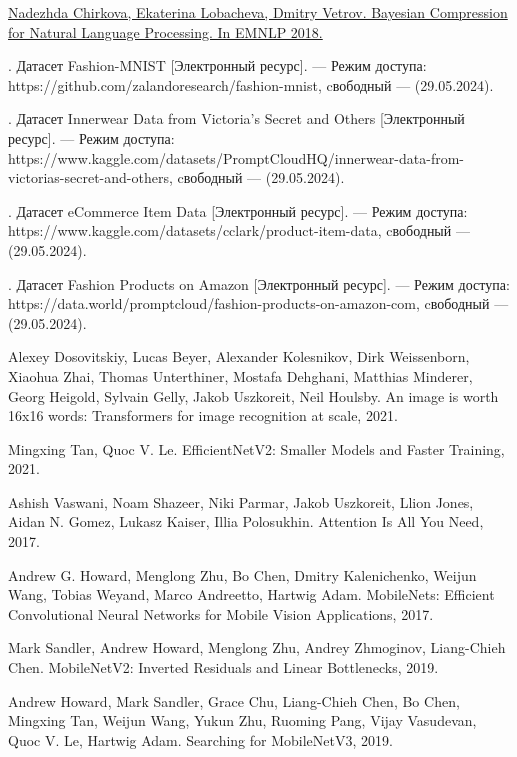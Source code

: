 \newpage 
\printbibliography[heading=bibintoc] 

\begin{thebibliography}{0}
	\hypertarget{chirkova18}{}
	\href{https://arxiv.org/abs/1810.10927}
	{Nadezhda Chirkova, Ekaterina Lobacheva, Dmitry Vetrov. Bayesian Compression for Natural Language Processing. In EMNLP 2018.}
	
	. Датасет Fashion-MNIST [Электронный ресурс]. — Режим доступа: https://github.com/zalandoresearch/fashion-mnist, cвободный — (29.05.2024).
	
	. Датасет Innerwear Data from Victoria's Secret and Others [Электронный ресурс]. — Режим доступа: https://www.kaggle.com/datasets/PromptCloudHQ/innerwear-data-from-victorias-secret-and-others, cвободный — (29.05.2024).
	
	. Датасет eCommerce Item Data [Электронный ресурс]. — Режим доступа: https://www.kaggle.com/datasets/cclark/product-item-data, cвободный — (29.05.2024).
	
	. Датасет Fashion Products on Amazon [Электронный ресурс]. — Режим доступа: https://data.world/promptcloud/fashion-products-on-amazon-com, cвободный — (29.05.2024).
	
	Alexey Dosovitskiy, Lucas Beyer, Alexander Kolesnikov, Dirk Weissenborn, Xiaohua Zhai, Thomas Unterthiner, Mostafa Dehghani, Matthias Minderer,
	Georg Heigold, Sylvain Gelly, Jakob Uszkoreit, Neil Houlsby. An image is worth 16x16 words: Transformers for image recognition at scale, 2021.
	
	Mingxing Tan, Quoc V. Le. EfficientNetV2: Smaller Models and Faster Training, 2021.
	
	Ashish Vaswani, Noam Shazeer, Niki Parmar, Jakob Uszkoreit, Llion Jones, Aidan N. Gomez, Lukasz Kaiser, Illia Polosukhin. Attention Is All You Need, 2017.
	
	Andrew G. Howard, Menglong Zhu, Bo Chen, Dmitry Kalenichenko, Weijun Wang, Tobias Weyand, Marco Andreetto, Hartwig Adam. MobileNets: Efficient Convolutional Neural Networks for Mobile Vision Applications, 2017.
	
	Mark Sandler, Andrew Howard, Menglong Zhu, Andrey Zhmoginov, Liang-Chieh Chen. MobileNetV2: Inverted Residuals and Linear Bottlenecks, 2019.
	
	Andrew Howard, Mark Sandler, Grace Chu, Liang-Chieh Chen, Bo Chen, Mingxing Tan,
	Weijun Wang, Yukun Zhu, Ruoming Pang, Vijay Vasudevan, Quoc V. Le, Hartwig Adam. Searching for MobileNetV3, 2019.
	

\end{thebibliography}
